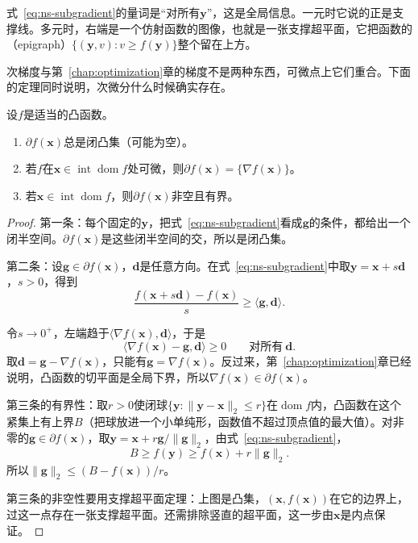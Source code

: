 式~\eqref{eq:ns-subgradient}的量词是“对所有$\bm{y}$”，这是全局信息。一元时它说的正是支撑线。多元时，右端是一个仿射函数的图像，也就是一张支撑超平面，它把函数的（epigraph）$\{(\bm{y},v):v\geq f(\bm{y})\}$整个留在上方。

次梯度与第~\ref{chap:optimization}章的梯度不是两种东西，可微点上它们重合。下面的定理同时说明，次微分什么时候确实存在。

\begin{theorem}[次微分的基本性质]
\label{thm:ns-subdiff-basic}
设$f$是适当的凸函数。
\begin{enumerate}
 \item $\partial f(\bm{x})$总是闭凸集（可能为空）。
 \item 若$f$在$\bm{x}\in\operatorname{int}\operatorname{dom}f$处可微，则$\partial f(\bm{x})=\{\nabla f(\bm{x})\}$。
 \item 若$\bm{x}\in\operatorname{int}\operatorname{dom}f$，则$\partial f(\bm{x})$非空且有界。
\end{enumerate}
\end{theorem}

\begin{proof}
第一条：每个固定的$\bm{y}$，把式~\eqref{eq:ns-subgradient}看成$\bm{g}$的条件，都给出一个闭半空间。$\partial f(\bm{x})$是这些闭半空间的交，所以是闭凸集。

第二条：设$\bm{g}\in\partial f(\bm{x})$，$\bm{d}$是任意方向。在式~\eqref{eq:ns-subgradient}中取$\bm{y}=\bm{x}+s\bm{d}$，$s>0$，得到
\[
 \frac{f(\bm{x}+s\bm{d})-f(\bm{x})}{s}\geq\langle\bm{g},\bm{d}\rangle.
\]

令$s\to0^+$，左端趋于$\langle\nabla f(\bm{x}),\bm{d}\rangle$，于是
\[
 \langle\nabla f(\bm{x})-\bm{g},\bm{d}\rangle\geq0\qquad\text{对所有}\ \bm{d}.
\]
取$\bm{d}=\bm{g}-\nabla f(\bm{x})$，只能有$\bm{g}=\nabla f(\bm{x})$。反过来，第~\ref{chap:optimization}章已经说明，凸函数的切平面是全局下界，所以$\nabla f(\bm{x})\in\partial f(\bm{x})$。

第三条的有界性：取$r>0$使闭球$\{\bm{y}:\lVert\bm{y}-\bm{x}\rVert_2\leq r\}$在$\operatorname{dom}f$内，凸函数在这个紧集上有上界$B$（把球放进一个小单纯形，函数值不超过顶点值的最大值）。对非零的$\bm{g}\in\partial f(\bm{x})$，取$\bm{y}=\bm{x}+r\bm{g}/\lVert\bm{g}\rVert_2$，由式~\eqref{eq:ns-subgradient}，
\[
 B\geq f(\bm{y})\geq f(\bm{x})+r\lVert\bm{g}\rVert_2.
\]
所以$\lVert\bm{g}\rVert_2\leq(B-f(\bm{x}))/r$。

第三条的非空性要用支撑超平面定理：上图是凸集，$(\bm{x},f(\bm{x}))$在它的边界上，过这一点存在一张支撑超平面。还需排除竖直的超平面，这一步由$\bm{x}$是内点保证。
\end{proof}

